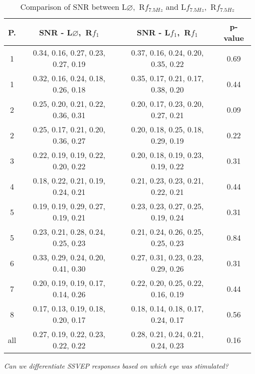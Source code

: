 \begin{table}[htbp]
  \centering
  \begin{tabularx}{\textwidth}{cccc}
      \hline      
      {\textbf{P.}} & {\textbf{SNR - L$\varnothing$,~R$f_{1}$}} & \textbf{SNR - L$f_{1}$,~R$f_{1}$} & \multicolumn{1}{c}{\textbf{p-value}}\\
      \hline
      1 & 0.34, 0.16, 0.27, 0.23, 0.27, 0.19 & 0.37, 0.16, 0.24, 0.20, 0.35, 0.22 &  0.69 \\
1 & 0.32, 0.16, 0.24, 0.18, 0.26, 0.18 & 0.35, 0.17, 0.21, 0.17, 0.38, 0.20 &  0.44 \\
2 & 0.25, 0.20, 0.21, 0.22, 0.36, 0.31 & 0.20, 0.17, 0.23, 0.20, 0.27, 0.21 &  0.09 \\
2 & 0.25, 0.17, 0.21, 0.20, 0.36, 0.27 & 0.20, 0.18, 0.25, 0.18, 0.29, 0.19 &  0.22 \\
3 & 0.22, 0.19, 0.19, 0.22, 0.20, 0.22 & 0.20, 0.18, 0.19, 0.23, 0.19, 0.22 &  0.31 \\
4 & 0.18, 0.22, 0.21, 0.19, 0.24, 0.21 & 0.21, 0.23, 0.23, 0.21, 0.22, 0.21 &  0.44 \\
5 & 0.19, 0.19, 0.29, 0.27, 0.19, 0.21 & 0.23, 0.23, 0.27, 0.25, 0.19, 0.24 &  0.31 \\
5 & 0.23, 0.21, 0.28, 0.24, 0.25, 0.23 & 0.21, 0.24, 0.26, 0.25, 0.25, 0.23 &  0.84 \\
6 & 0.33, 0.29, 0.24, 0.20, 0.41, 0.30 & 0.27, 0.31, 0.23, 0.23, 0.29, 0.26 &  0.31 \\
7 & 0.20, 0.19, 0.19, 0.17, 0.14, 0.26 & 0.22, 0.20, 0.25, 0.22, 0.16, 0.19 &  0.44 \\
8 & 0.17, 0.13, 0.19, 0.18, 0.20, 0.17 & 0.18, 0.14, 0.18, 0.17, 0.24, 0.17 &  0.56 \\
all & 0.27, 0.19, 0.22, 0.23, 0.22, 0.22 & 0.28, 0.21, 0.24, 0.21, 0.24, 0.23 & 0.16 \\
   \hline
  \end{tabularx}
  \caption{Comparison of SNR between L$\varnothing$,~R$f_{7.5 Hz}$ and L$f_{7.5 Hz}$,~R$f_{7.5 Hz}$}
  \emph{Can we differentiate SSVEP responses based on which eye was stimulated?}
  \label{tab:rq1c3}
\end{table}


